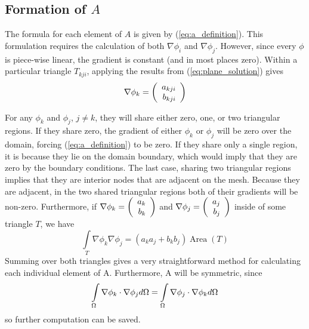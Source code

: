\subsection{Formation of $A$}
The formula for each element of $A$ is given by (\ref{eq:a_definition}). This formulation requires the calculation
of both $\nabla \phi_i$ and $\nabla \phi_j$. However, since every $\phi$ is piece-wise linear, the gradient
is constant (and in most places zero). Within a particular triangle $T_{kji}$, applying the results from
(\ref{eq:plane_solution}) gives
\begin{equation} \label{eq:grad_phi_definition}
\nabla \phi_k = \left(\begin{array}{rrrr} a_{kji} \\ b_{kji} \\ \end{array} \right)
\end{equation}

For any $\phi_k$ and $\phi_j$, $j \ne k$, they will share either zero, one, or two triangular regions. If they share
zero, the gradient of either $\phi_k$ or $\phi_j$ will be zero over the domain, forcing (\ref{eq:a_definition}) to
be zero. If they share only a single region, it is because they lie on the domain boundary, which would imply that
they are zero by the boundary conditions. The last case, sharing two triangular regions implies that they are interior
nodes that are adjacent on the mesh. Because they are adjacent, in the two shared triangular regions both of their
gradients will be non-zero. Furthermore, if $\nabla \phi_k = \left(\begin{array}{rrrr} a_k \\ b_k \\ \end{array} \right)$ and $\nabla \phi_j = \left(\begin{array}{rrrr} a_j \\ b_j \\ \end{array} \right)$
inside of some triangle $T$, we have
\begin{equation}
\int\limits_T \nabla \phi_k \nabla \phi_j
=
\left( a_k a_j + b_k b_j \right) \mathop{Area}(T)
\end{equation}
Summing over both triangles gives a very straightforward method for calculating each individual element of A. Furthermore,
A will be symmetric, since
\begin{equation}
\int\limits_{\Omega} \nabla \phi_k \cdot \nabla \phi_j d\Omega = \int\limits_{\Omega} \nabla \phi_j \cdot \nabla \phi_k d\Omega
\end{equation}
so further computation can be saved.
